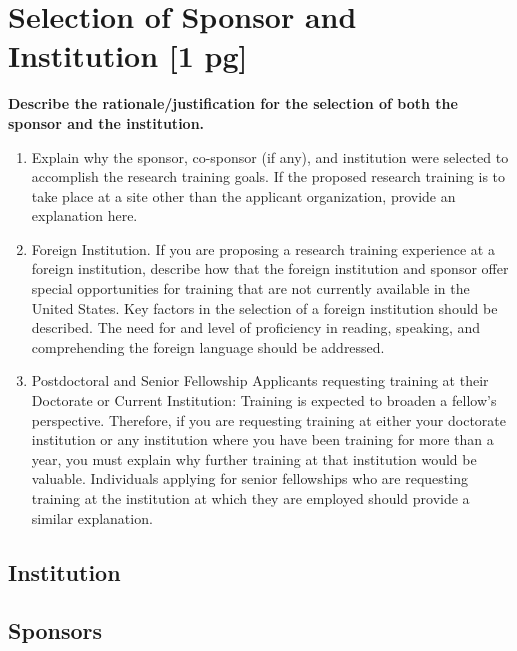 \documentclass[11pt]{article}
\begin{document}
\section*{Selection of Sponsor and Institution [1 pg]}
\textbf{Describe the rationale/justification for the selection of both the sponsor and the institution.}
\begin{enumerate}
	\item Explain why the sponsor, co-sponsor (if any), and institution were selected to accomplish
	the research training goals. If the proposed research training is to take place at a site
	other than the applicant organization, provide an explanation here.
	\item Foreign Institution. If you are proposing a research training experience at a foreign
	institution, describe how that the foreign institution and sponsor offer special
	opportunities for training that are not currently available in the United States. Key
	factors in the selection of a foreign institution should be described. The need for and
	level of proficiency in reading, speaking, and comprehending the foreign language
	should be addressed.
	\item Postdoctoral and Senior Fellowship Applicants requesting training at their
	Doctorate or Current Institution: Training is expected to broaden a fellow's perspective.
	Therefore, if you are requesting training at either your doctorate institution or any
	institution where you have been training for more than a year, you must explain why
	further training at that institution would be valuable. Individuals applying for senior
	fellowships who are requesting training at the institution at which they are employed
	should provide a similar explanation.
\end{enumerate}

\subsection*{Institution}
\lipsum[50-52]

\subsection*{Sponsors}
\lipsum[56-58]
\end{document}
